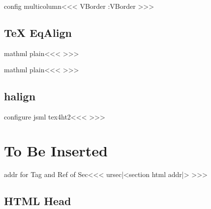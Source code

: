 {\<config multicolumn\><<<
   {\let\sv:VBorder\VBorder
    \let\VBorder\empty
   }
   {\let\VBorder\sv:VBorder}   
   {\ifmmode \else
       \ifvmode\IgnorePar\fi
    \fi   {}}
   {\ifmmode \else
       \ifvmode\IgnorePar\fi \EndP\fi {} }
\def\gob:sp#1{#1}
>>>








\section{TeX EqAlign}


\<mathml plain\><<<
   {}
   {}
   {}
   {}
   {}
   {}
\def\:eqalignno:{\Configure{noalign}
  {\HCode{<mtr><mtd class="noalign" colspan="2">}}%
  {\HCode{</mtd></mtr>}}}
>>>


\<mathml plain\><<<
   {}
   {}
   {}
   {}
   {}
   {}
\def\:leqalignno:{\Configure{noalign}
  {\HCode{<mtr><mtd class="noalign" colspan="2">}}%
  {\HCode{</mtd></mtr>}}}
>>>



\section{halign}


\<configure jsml tex4ht2\><<<
>>>


\chapter{To Be Inserted}



\<addr for Tag and Ref of Sec\><<<
\xdef\:cursec{|<section html addr|>}%
>>>

\section{HTML Head}

}
